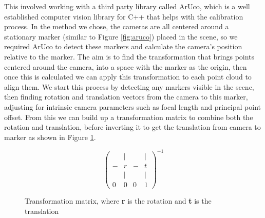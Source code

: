 \documentclass{article}
\begin{document}
This involved working with a third party library called ArUco, which is a well established computer vision library for C++ that helps with the calibration process. In the method we chose, the cameras are all centered around a stationary marker (similar to Figure \ref{fig:aruco}) placed in the scene, so we required ArUco to detect these markers and calculate the camera's position relative to the marker. The aim is to find the transformation that brings points centered around the camera, into a space with the marker as the origin, then once this is calculated we can apply this transformation to each point cloud to align them. We start this process by detecting any markers visible in the scene, then finding rotation and translation vectors from the camera to this marker, adjusting for intrinsic camera parameters such as focal length and principal point offset. From this we can build up a transformation matrix to combine both the rotation and translation, before inverting it to get the translation from camera to marker as shown in Figure \ref{fig:transformationMatrix}. \\
\begin{figure}[h]
  \[\left(\begin{array}{cccc}
      & | &   & | \\
    - & r & - & t \\ 
      & | &   & | \\
    0 & 0 & 0 & 1
    \end{array}\right)^{-1}\]
  \caption{Transformation matrix, where \textbf{r} is the rotation and \textbf{t} is the translation}
  \label{fig:transformationMatrix}
\end{figure}
\end{document}

